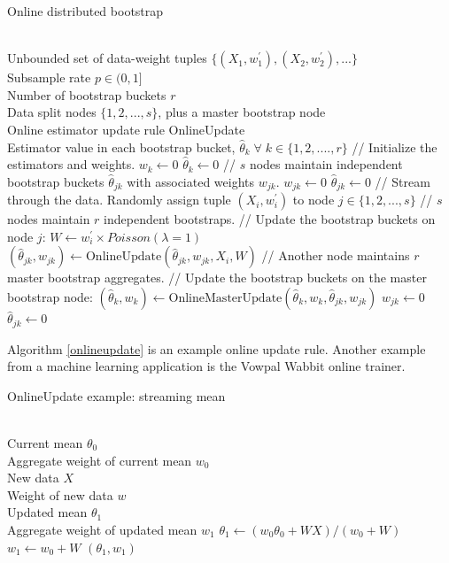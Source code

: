 \documentclass{article}
\begin{document}
\begin{algorithm}
\caption{Online distributed bootstrap}
\label{onlineblb}
\begin{algorithmic}[1]
\Require \\
Unbounded set of data-weight tuples $\{(X_1,w^{\prime}_1), (X_2,w^{\prime}_2), ...\}$\\
Subsample rate $p\in(0,1]$\\
Number of bootstrap buckets $r$\\
Data split nodes $\{1,2, ..., s\}$, plus a master bootstrap node\\
Online estimator update rule OnlineUpdate
\Ensure \\
Estimator value in each bootstrap bucket, $\hat\theta_{k}\;\forall \; k\in \{1, 2, ...., r\}$
\State // Initialize the estimators and weights.
\State $w_{k} \gets 0$
\State $\hat\theta_{k} \gets 0$
\State // $s$ nodes maintain independent bootstrap buckets $\hat\theta_{jk}$ with associated weights $w_{jk}$.
\State $w_{jk} \gets 0$
\State $\hat\theta_{jk} \gets 0$
\EndFor
\EndFor
\State // Stream through the data.
\State Randomly assign tuple $(X_i,w^{\prime}_i)$ to node $j \in \{1, 2, ..., s\}$
\State // $s$ nodes maintain $r$ independent bootstraps.
\State // Update the bootstrap buckets on node $j$:
\State $W \gets w^{\prime}_i \times Poisson(\lambda = 1)$
\State $(\hat\theta_{jk}, w_{jk}) \gets \mathrm{OnlineUpdate}(\hat\theta_{jk}, w_{jk}, X_i, W)$
\EndFor
{}
\State // Another node maintains $r$ master bootstrap aggregates.
\State // Update the bootstrap buckets on the master bootstrap node:
\State $(\hat\theta_{k}, w_{k}) \gets \mathrm{OnlineMasterUpdate}(\hat\theta_{k}, w_{k},\hat\theta_{jk}, w_{jk})$
\State $w_{jk} \gets 0$
\State $\hat\theta_{jk} \gets 0$
\EndFor
\EndIf
\EndIf
\EndFor
\EndProcedure
\end{algorithmic}
\end{algorithm}

Algorithm \ref{onlineupdate} is an example online update rule. Another example
from a machine learning application is the Vowpal Wabbit online trainer.

\begin{algorithm}
\caption{OnlineUpdate example: streaming mean}
\label{onlineupdate}
\begin{algorithmic}[1]
\Require \\
Current mean $\theta_0$ \\
Aggregate weight of current mean $w_0$ \\
New data $X$ \\
Weight of new data $w$
\Ensure \\
Updated mean $\theta_1$ \\
Aggregate weight of updated mean $w_1$
\State $\theta_1 \gets (w_0\theta_0 + WX)/(w_0 + W)$
\State $w_1 \gets w_0 + W$ 
\State \Return $(\theta_1, w_1)$
\EndProcedure
\end{algorithmic}
\end{algorithm}
\end{document}
